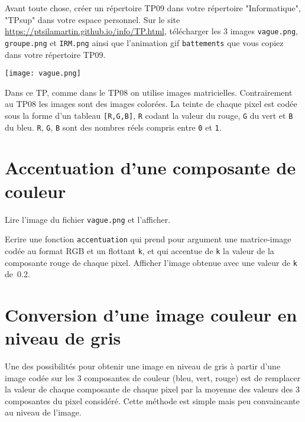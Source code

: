 
Avant toute chose, créer un répertoire TP09 dans votre répertoire "Informatique", "TPsup" dans votre espace personnel. Sur le site \url{https://ptsilamartin.github.io/info/TP.html}, télécharger les 3  images \texttt{vague.png}, \texttt{groupe.png} et \texttt{IRM.png} ainsi que l'animation gif \texttt{battements} que vous copiez dans votre répertoire TP09.

\begin{marginfigure}%
\texttt{[image: vague.png]}
\end{marginfigure}

Dans ce TP, comme dans le TP08 on utilise images matricielles. Contrairement au TP08 les images sont des images colorées. La teinte de chaque pixel est codée sous la forme d'un tableau \lstinline{[R,G,B]}, \lstinline{R} codant la valeur du rouge, \lstinline{G} du vert et \lstinline{B} du bleu. \lstinline{R}, \lstinline{G}, \lstinline{B} sont des nombres réels compris entre \lstinline{0} et \lstinline{1}. 




\section*{Accentuation d'une composante de couleur}
\begin{question}
Lire l'image du fichier \texttt{vague.png} et l'afficher.
\end{question}

\begin{question}
Ecrire une fonction \lstinline{accentuation} qui prend pour argument une matrice-image codée au format RGB et un flottant \lstinline{k}, et qui accentue de \lstinline{k} la valeur de la composante rouge de chaque pixel. Afficher l'image obtenue avec une valeur de \lstinline{k} de~0.2. 
\end{question}




\section*{Conversion d'une image couleur en niveau de gris}

Une des possibilités pour obtenir une image en niveau de gris à partir d’une image codée sur les 3 composantes de couleur (bleu, vert, rouge) est de remplacer la valeur de chaque composante de chaque pixel par la moyenne des valeurs des 3 composantes du pixel considéré. Cette méthode est simple mais peu convaincante au niveau de l’image.

